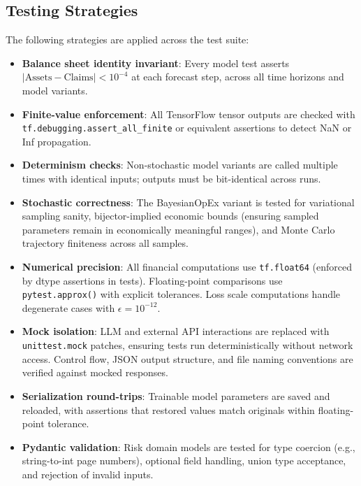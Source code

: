 \documentclass[12pt,a4paper]{article}
\begin{document}
\subsection{Testing Strategies}

The following strategies are applied across the test suite:

\begin{itemize}
  \item \textbf{Balance sheet identity invariant}: Every model test
    asserts $\lvert \text{Assets} - \text{Claims} \rvert < 10^{-4}$ at
    each forecast step, across all time horizons and model variants.

  \item \textbf{Finite-value enforcement}: All TensorFlow tensor outputs
    are checked with \texttt{tf.debugging.assert\_all\_finite} or
    equivalent assertions to detect NaN or Inf propagation.

  \item \textbf{Determinism checks}: Non-stochastic model variants are
    called multiple times with identical inputs; outputs must be
    bit-identical across runs.

  \item \textbf{Stochastic correctness}: The BayesianOpEx variant is
    tested for variational sampling sanity, bijector-implied economic
    bounds (ensuring sampled parameters remain in economically meaningful
    ranges), and Monte Carlo trajectory finiteness across all samples.

  \item \textbf{Numerical precision}: All financial computations use
    \texttt{tf.float64} (enforced by dtype assertions in tests).
    Floating-point comparisons use \texttt{pytest.approx()} with
    explicit tolerances. Loss scale computations handle degenerate cases
    with $\epsilon = 10^{-12}$.

  \item \textbf{Mock isolation}: LLM and external API interactions are
    replaced with \texttt{unittest.mock} patches, ensuring tests run
    deterministically without network access. Control flow, JSON output
    structure, and file naming conventions are verified against mocked
    responses.

  \item \textbf{Serialization round-trips}: Trainable model parameters
    are saved and reloaded, with assertions that restored values match
    originals within floating-point tolerance.

  \item \textbf{Pydantic validation}: Risk domain models are tested for
    type coercion (e.g., string-to-int page numbers), optional field
    handling, union type acceptance, and rejection of invalid inputs.
\end{itemize}
\end{document}

